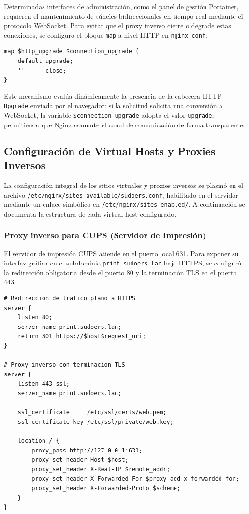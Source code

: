 Determinadas interfaces de administración, como el panel de gestión Portainer,
requieren el mantenimiento de túneles bidireccionales en tiempo real mediante el
protocolo WebSocket. Para evitar que el proxy inverso cierre o degrade estas
conexiones, se configuró el bloque \texttt{map} a nivel HTTP en
\texttt{nginx.conf}:

\begin{lstlisting}[style=terminal]
map $http_upgrade $connection_upgrade {
    default upgrade;
    ''      close;
}
\end{lstlisting}

Este mecanismo evalúa dinámicamente la presencia de la cabecera HTTP
\texttt{Upgrade} enviada por el navegador: si la solicitud solicita una
conversión a WebSocket, la variable \texttt{\$connection\_upgrade} adopta el
valor \texttt{upgrade}, permitiendo que Nginx conmute el canal de comunicación
de forma transparente.

\subsection{Configuración de Virtual Hosts y Proxies Inversos}

La configuración integral de los sitios virtuales y proxies inversos se plasmó
en el archivo \texttt{/etc/nginx/sites-available/sudoers.conf}, habilitado en el
servidor mediante un enlace simbólico en \texttt{/etc/nginx/sites-enabled/}. A
continuación se documenta la estructura de cada virtual host configurado.

\subsubsection{Proxy inverso para CUPS (Servidor de Impresión)}

El servidor de impresión CUPS atiende en el puerto local 631. Para exponer su
interfaz gráfica en el subdominio \texttt{print.sudoers.lan} bajo HTTPS, se
configuró la redirección obligatoria desde el puerto 80 y la terminación TLS
en el puerto 443:

\begin{lstlisting}[style=terminal]
# Redireccion de trafico plano a HTTPS
server {
    listen 80;
    server_name print.sudoers.lan;
    return 301 https://$host$request_uri;
}

# Proxy inverso con terminacion TLS
server {
    listen 443 ssl;
    server_name print.sudoers.lan;

    ssl_certificate     /etc/ssl/certs/web.pem;
    ssl_certificate_key /etc/ssl/private/web.key;

    location / {
        proxy_pass http://127.0.0.1:631;
        proxy_set_header Host $host;
        proxy_set_header X-Real-IP $remote_addr;
        proxy_set_header X-Forwarded-For $proxy_add_x_forwarded_for;
        proxy_set_header X-Forwarded-Proto $scheme;
    }
}
\end{lstlisting}

